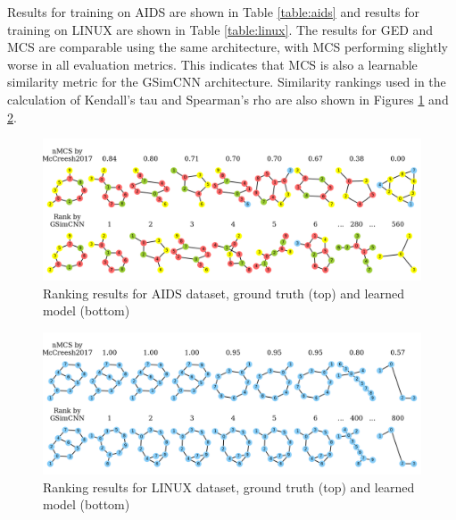Results for training on AIDS are shown in Table \ref{table:aids} and results for training on LINUX are shown in Table \ref{table:linux}. The results for GED and MCS are comparable using the same architecture, with MCS performing slightly worse in all evaluation metrics. This indicates that MCS is also a learnable similarity metric for the GSimCNN architecture. Similarity rankings used in the calculation of Kendall's tau and Spearman's rho are also shown in Figures \ref{fig:ranking_aids} and \ref{fig:ranking_linux}.

\begin{figure}
    \centering
    \includegraphics[width=\textwidth]{figures/query_demo_aids700nef_mccreesh2017_15_norm.png}
    \caption{Ranking results for AIDS dataset, ground truth (top) and learned model (bottom)}
    \label{fig:ranking_aids}
\end{figure}

\begin{figure}
    \centering
    \includegraphics[width=\textwidth]{figures/query_demo_linux_mccreesh2017_35_norm.png}
    \caption{Ranking results for LINUX dataset, ground truth (top) and learned model (bottom)}
    \label{fig:ranking_linux}
\end{figure}
